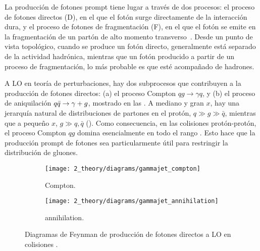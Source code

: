 La producción de fotones prompt tiene lugar a través de dos procesos: el proceso de fotones directos (D), en el que el fotón surge directamente de la interacción dura, y el proceso de fotones de fragmentación (F), en el que el fotón se emite en la fragmentación de un partón de alto momento transverso~\cite{Szczurek_Pietrycki-2007,Belghobsi_Fontannaz-2009}. Desde un punto de vista topológico, cuando se produce un fotón directo, generalmente est\'a separado de la actividad hadrónica, mientras que un fotón producido a partir de un proceso de fragmentación, lo más probable es que esté acompañado de hadrones.

A \ac{LO} en teoría de perturbaciones, hay dos subprocesos que contribuyen a la producción de fotones directos: (a) el proceso Compton \(qg \to \gamma q\), y (b) el proceso de aniquilación \(q\bar{q} \rightarrow \gamma+g\), mostrado en las \Figs{\ref{fig:theory:sm:prompt_photon:feynman_lo_direct:compton}}{\ref{fig:theory:sm:prompt_photon:feynman_lo_direct:annihilation}}. A mediano y gran \(x\), hay una jerarquía natural de distribuciones de partones en el protón, \(q \gg g \gg \bar{q}\), mientras que a pequeño \(x\), \(g \gg q,\bar{q}\) (\Fig{\ref{fig:theory:sm:hadron_interactions:pdfs}}). Como consecuencia, en las colisiones protón-protón, el proceso Compton \(qg\) domina esencialmente en todo el rango \pt. Esto hace que la producción prompt de fotones sea particularmente útil para restringir la distribución de gluones.

\begin{figure}[ht!]
    \centering
    \begin{subfigure}[h]{0.49\linewidth}
        \centering
        \texttt{[image: 2\_theory/diagrams/gammajet\_compton]}
        \caption{Compton.}
        \label{fig:theory:sm:prompt_photon:feynman_lo_direct:compton}
    \end{subfigure}
    \hfill
    \begin{subfigure}[h]{0.49\linewidth}
        \centering
        \texttt{[image: 2\_theory/diagrams/gammajet\_annihilation]}
        \caption{annihilation.}
        \label{fig:theory:sm:prompt_photon:feynman_lo_direct:annihilation}
    \end{subfigure}
    \caption{Diagramas de Feynman de producci\'on de fotones directos a \ac{LO} en colisiones \pp.}
    \label{fig:theory:sm:prompt_photon:feynman_lo_direct}
\end{figure}

